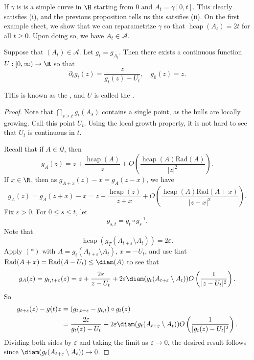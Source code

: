 \documentclass[a4paper]{article}
\DeclareMathOperator\hcap{hcap}
\newcommand\rad{\mathrm{Rad}}
\begin{document}
\begin{eg}
  If $\gamma$ is is a simple curve in $\H$ starting from $0$ and $A_t = \gamma[0, t]$. This clearly satisfies (i), and the previous proposition tells us this satsifies (ii). On the first example sheet, we show that we can reparametrize $\gamma$ so that $\hcap(A_t) = 2t$ for all $t \geq 0$. Upon doing so, we have $A_t \in \mathcal{A}$.
\end{eg}

\begin{thm} %
  Suppose that $(A_t) \in \mathcal{A}$. Let $g_t = g_{A_t}$. Then there exists a continuous function $U: [0, \infty) \to \R$ so that
  \[
    \partial_t g_t (z) = \frac{z}{g_t(z) - U_t},\quad g_0(z) = z.
  \]
\end{thm}
THis is known as the , and $U$ is called the .

\begin{proof}
  Note that $\bigcap_{s \geq t} g_t(A_s)$ contains a single point, as the hulls are locally growing. Call this point $U_t$. Using the local growth property, it is not hard to see that $U_t$ is continuous in $t$.

  Recall that if $A \in \mathcal{Q}$, then
  \[
    g_A(z) = z + \frac{\hcap(A)}{z} + O\left(\frac{\hcap(A) \rad(A)}{|z|^2}\right).
  \]
  If $x \in \R$, then as $g_{A + x}(z) - x = g_A(z - x)$, we have
  \[
    g_A(z) = g_A(z + x) - x = z + \frac{\hcap(z)}{z + x} + O\left(\frac{\hcap(A) \rad(A + x)}{|z + x|^2}\right).\tag{$*$}
  \]
  Fix $\varepsilon > 0$. For $0 \leq s \leq t$, let
  \[
    g_{s, t} = g_t \circ g_s^{-1}.
  \]
  Note that
  \[
    \hcap(g_T(A_{t + \varepsilon} \setminus A_t)) = 2 \varepsilon.
  \]
  Apply $(*)$ with $A = g_t(A_{t + \varepsilon} \setminus A_t)$, $x = -U_t$, and use that $\rad(A + x) = \rad(A - U_t) \leq \diam(A)$ to see that
  \[
    g_A(z) = g_{t, t + \varepsilon}(z) = z + \frac{2\varepsilon}{z - U_t} + 2 \varepsilon \diam(g_t(A_{t + \varepsilon} \setminus A_t))O\left(\frac{1}{|z - U_t|^2}\right).
  \]
  So
  \begin{align*}
    g_{t + \varepsilon}(z) - g(t)z &= (g_{t, t + \varepsilon} - g_{t, t}) \circ g_t(z)\\
    &= \frac{2\varepsilon}{g_t(z) - U_t} + 2\varepsilon \diam(g_t(A_{t + \varepsilon} \setminus A_t)) O\left(\frac{1}{|g_t(z) - U_t|^2}\right).
  \end{align*}
  Dividing both sides by $\varepsilon$ and taking the limit as $\varepsilon \to 0$, the desired result follows since $\diam(g_t(A_{t + \varepsilon} \setminus A_t)) \to 0$.
\end{proof}
\end{document}
